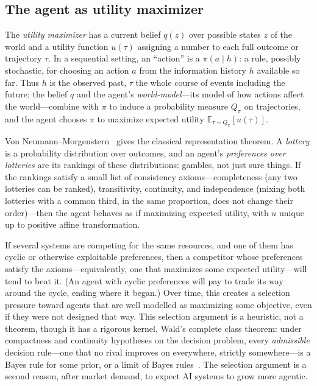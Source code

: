 \subsection{The agent as utility maximizer}

The \emph{utility maximizer} has a current belief $q(z)$ over possible states $z$ of the world and a utility function $u(\tau)$ assigning a number to each full outcome or trajectory $\tau$. In a sequential setting, an ``action'' is a  $\pi(a\mid h)$: a rule, possibly stochastic, for choosing an action $a$ from the information history $h$ available so far. Thus $h$ is the observed past, $\tau$ the whole course of events including the future; the belief $q$ and the agent's \emph{world-model}---its model of how actions affect the world---combine with $\pi$ to induce a probability measure $Q_\pi$ on trajectories, and the agent chooses $\pi$ to maximize expected utility $\mathbb{E}_{\tau\sim Q_\pi}[u(\tau)]$.

Von Neumann--Morgenstern~\cite{vnm1944} gives the classical representation theorem. A \emph{lottery} is a probability distribution over outcomes, and an agent's \emph{preferences over lotteries} are its rankings of these distributions: gambles, not just sure things. If the rankings satisfy a small list of consistency axioms---completeness (any two lotteries can be ranked), transitivity, continuity, and independence (mixing both lotteries with a common third, in the same proportion, does not change their order)---then the agent behaves as if maximizing expected utility, with $u$ unique up to positive affine transformation.

If several systems are competing for the same resources, and one of them has cyclic or otherwise exploitable preferences, then a competitor whose preferences satisfy the axioms---equivalently, one that maximizes some expected utility---will tend to beat it. (An agent with cyclic preferences will pay to trade its way around the cycle, ending where it began.) Over time, this creates a selection pressure toward agents that are well modelled as maximizing some objective, even if they were not designed that way. This selection argument is a heuristic, not a theorem, though it has a rigorous kernel, Wald's complete class theorem: under compactness and continuity hypotheses on the decision problem, every \emph{admissible} decision rule---one that no rival improves on everywhere, strictly somewhere---is a Bayes rule for some prior, or a limit of Bayes rules~\cite{wald1950}. The selection argument is a second reason, after market demand, to expect AI systems to grow more agentic.

